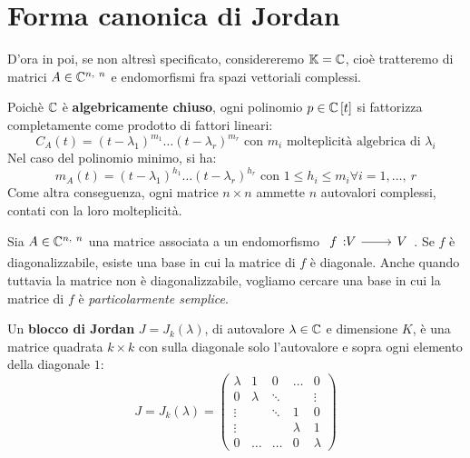 \section{Forma canonica di Jordan}
D'ora in poi, se non altresì specificato, considereremo $\mathbb{K}=\mathbb{C}$, cioè tratteremo di matrici $A\in \mathbb{C}^{n,\ n}$ e endomorfismi fra spazi vettoriali complessi.
\begin{observe}\label{complessichiusi}
Poichè $\mathbb{C}$ è \textbf{algebricamente chiuso}, ogni polinomio $p\in\mathbb{C}\left[t\right]$ si fattorizza completamente come prodotto di fattori lineari:
\begin{equation}
	C_A\left(t\right)=\left(t-\lambda_1\right)^{m_1}\ldots\left(t-\lambda_r\right)^{m_r}\text{ con } m_i \text{ molteplicità algebrica di } \lambda_i
\end{equation}
Nel caso del polinomio minimo, si ha:
\begin{equation}
	m_A\left(t\right)=\left(t-\lambda_1\right)^{h_1}\ldots\left(t-\lambda_r\right)^{h_r}\text{ con } 1\leq h_i\leq m_i \forall i=1,\ldots,\ r
\end{equation}
Come altra conseguenza, ogni matrice $n\times n$ ammette $n$ autovalori complessi, contati con la loro molteplicità.
\end{observe}
Sia $A\in \mathbb{C}^{n,\ n}$ una matrice associata a un endomorfismo $\funz{f}{V}{V}$. Se $f$ è diagonalizzabile, esiste una base in cui la matrice di $f$ è diagonale. Anche quando tuttavia la matrice non è diagonalizzabile, vogliamo cercare una base in cui la matrice di $f$ è \textit{particolarmente semplice}.
\begin{define}
	Un \textbf{blocco di Jordan} $J=J_k\left(\lambda\right)$, di autovalore $\lambda\in\mathbb{C}$ e dimensione $K$, è una matrice quadrata $k\times k$ con sulla diagonale solo l'autovalore e sopra ogni elemento della diagonale $1$:
	\begin{equation}%
		    J=J_k\left(\lambda\right) = \left(
		\begin{array}{ccccc}
\lambda	& 1 		&  0		& \ldots 	& 0 \\
0		& \lambda 	& \ddots	& 			& \vdots\\
\vdots	&  			& \ddots	& 1 		& 0\\
\vdots	& 			&   		& \lambda 	& 1\\
0		&  \dots  	&  \dots 	&  0 		& \lambda
		\end{array}
		\right)
	\end{equation}
\end{define}
